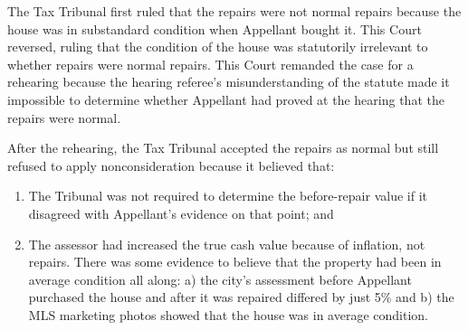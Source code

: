 \documentclass[12pt,\documentclassflag]{michiganCourtOfAppealsBrief}
\begin{document}
The Tax Tribunal first ruled that the repairs were not normal repairs because the house was in substandard condition when Appellant bought it. This Court reversed, ruling that the condition of the house was statutorily irrelevant to whether repairs were normal repairs. This Court remanded the case for a rehearing because the hearing referee's misunderstanding of the statute made it impossible to determine whether Appellant had proved at the hearing that the repairs were normal.

After the rehearing, the Tax Tribunal accepted the repairs as normal but still refused to apply nonconsideration because it believed that:

\begin{enumerate}
\item The Tribunal was not required to determine the before-repair value if it disagreed with Appellant's evidence on that point; and
\item The assessor had increased the true cash value because of inflation, not repairs. There was some evidence to believe that the property had been in average condition all along: a) the city's assessment before Appellant purchased the house and after it was repaired differed by just 5\% and b) the MLS marketing photos showed that the house was in average condition. 
\end{enumerate}





\end{document}
